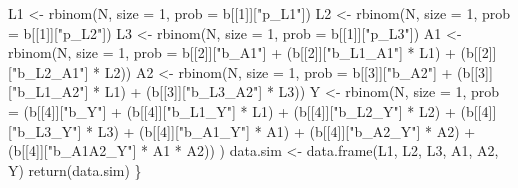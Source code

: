 \documentclass[
]{book}
\newenvironment{Shaded}{\begin{snugshade}}{\end{snugshade}}
\newcommand{\AttributeTok}[1]{\textcolor[rgb]{0.77,0.63,0.00}{#1}}
\newcommand{\DecValTok}[1]{\textcolor[rgb]{0.00,0.00,0.81}{#1}}
\newcommand{\FunctionTok}[1]{\textcolor[rgb]{0.00,0.00,0.00}{#1}}
\newcommand{\NormalTok}[1]{#1}
\newcommand{\OtherTok}[1]{\textcolor[rgb]{0.56,0.35,0.01}{#1}}
\newcommand{\SpecialCharTok}[1]{\textcolor[rgb]{0.00,0.00,0.00}{#1}}
\newcommand{\StringTok}[1]{\textcolor[rgb]{0.31,0.60,0.02}{#1}}
\begin{document}
\begin{Shaded}
\begin{Highlighting}[]
\NormalTok{  L1 }\OtherTok{\textless{}{-}} \FunctionTok{rbinom}\NormalTok{(N, }\AttributeTok{size =} \DecValTok{1}\NormalTok{, }\AttributeTok{prob =}\NormalTok{ b[[}\DecValTok{1}\NormalTok{]][}\StringTok{"p\_L1"}\NormalTok{]) }
\NormalTok{  L2 }\OtherTok{\textless{}{-}} \FunctionTok{rbinom}\NormalTok{(N, }\AttributeTok{size =} \DecValTok{1}\NormalTok{, }\AttributeTok{prob =}\NormalTok{ b[[}\DecValTok{1}\NormalTok{]][}\StringTok{"p\_L2"}\NormalTok{])}
\NormalTok{  L3 }\OtherTok{\textless{}{-}} \FunctionTok{rbinom}\NormalTok{(N, }\AttributeTok{size =} \DecValTok{1}\NormalTok{, }\AttributeTok{prob =}\NormalTok{ b[[}\DecValTok{1}\NormalTok{]][}\StringTok{"p\_L3"}\NormalTok{])}
\NormalTok{  A1 }\OtherTok{\textless{}{-}} \FunctionTok{rbinom}\NormalTok{(N, }\AttributeTok{size =} \DecValTok{1}\NormalTok{, }\AttributeTok{prob =}\NormalTok{ b[[}\DecValTok{2}\NormalTok{]][}\StringTok{"b\_A1"}\NormalTok{] }\SpecialCharTok{+} 
\NormalTok{                 (b[[}\DecValTok{2}\NormalTok{]][}\StringTok{"b\_L1\_A1"}\NormalTok{] }\SpecialCharTok{*}\NormalTok{ L1) }\SpecialCharTok{+}\NormalTok{ (b[[}\DecValTok{2}\NormalTok{]][}\StringTok{"b\_L2\_A1"}\NormalTok{] }\SpecialCharTok{*}\NormalTok{ L2))}
\NormalTok{  A2 }\OtherTok{\textless{}{-}} \FunctionTok{rbinom}\NormalTok{(N, }\AttributeTok{size =} \DecValTok{1}\NormalTok{, }\AttributeTok{prob =}\NormalTok{ b[[}\DecValTok{3}\NormalTok{]][}\StringTok{"b\_A2"}\NormalTok{] }\SpecialCharTok{+} 
\NormalTok{                 (b[[}\DecValTok{3}\NormalTok{]][}\StringTok{"b\_L1\_A2"}\NormalTok{] }\SpecialCharTok{*}\NormalTok{ L1) }\SpecialCharTok{+}\NormalTok{ (b[[}\DecValTok{3}\NormalTok{]][}\StringTok{"b\_L3\_A2"}\NormalTok{] }\SpecialCharTok{*}\NormalTok{ L3))}
\NormalTok{  Y }\OtherTok{\textless{}{-}} \FunctionTok{rbinom}\NormalTok{(N, }\AttributeTok{size =} \DecValTok{1}\NormalTok{, }\AttributeTok{prob =}\NormalTok{ (b[[}\DecValTok{4}\NormalTok{]][}\StringTok{"b\_Y"}\NormalTok{] }\SpecialCharTok{+} 
\NormalTok{                                     (b[[}\DecValTok{4}\NormalTok{]][}\StringTok{"b\_L1\_Y"}\NormalTok{] }\SpecialCharTok{*}\NormalTok{ L1) }\SpecialCharTok{+} 
\NormalTok{                                     (b[[}\DecValTok{4}\NormalTok{]][}\StringTok{"b\_L2\_Y"}\NormalTok{] }\SpecialCharTok{*}\NormalTok{ L2) }\SpecialCharTok{+}
\NormalTok{                                     (b[[}\DecValTok{4}\NormalTok{]][}\StringTok{"b\_L3\_Y"}\NormalTok{] }\SpecialCharTok{*}\NormalTok{ L3) }\SpecialCharTok{+}  
\NormalTok{                                     (b[[}\DecValTok{4}\NormalTok{]][}\StringTok{"b\_A1\_Y"}\NormalTok{] }\SpecialCharTok{*}\NormalTok{ A1) }\SpecialCharTok{+} 
\NormalTok{                                     (b[[}\DecValTok{4}\NormalTok{]][}\StringTok{"b\_A2\_Y"}\NormalTok{] }\SpecialCharTok{*}\NormalTok{ A2) }\SpecialCharTok{+} 
\NormalTok{                                     (b[[}\DecValTok{4}\NormalTok{]][}\StringTok{"b\_A1A2\_Y"}\NormalTok{] }\SpecialCharTok{*}\NormalTok{ A1 }\SpecialCharTok{*}\NormalTok{ A2)) )}
\NormalTok{  data.sim }\OtherTok{\textless{}{-}} \FunctionTok{data.frame}\NormalTok{(L1, L2, L3, A1, A2, Y)}
  \FunctionTok{return}\NormalTok{(data.sim)}
\NormalTok{\}}


\end{Highlighting}
\end{Shaded}
\end{document}
